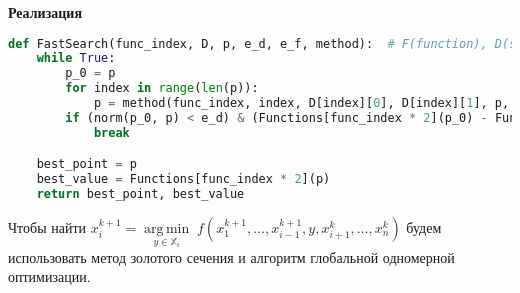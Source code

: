\textbf{Реализация}
\begin{lstlisting}[language=Python]
def FastSearch(func_index, D, p, e_d, e_f, method):  # F(function), D(set), p(start point), e(error)
    while True:
        p_0 = p
        for index in range(len(p)):
            p = method(func_index, index, D[index][0], D[index][1], p, e_d, e_f)
        if (norm(p_0, p) < e_d) & (Functions[func_index * 2](p_0) - Functions[func_index * 2](p) < e_f):
            break

    best_point = p
    best_value = Functions[func_index * 2](p)
    return best_point, best_value
\end{lstlisting}


\begin{remark*}
Чтобы найти ${\displaystyle x_{i}^{k+1}={\underset {y\in \mathbb {X}_i }{\operatorname {arg\,min} }}\;f(x_{1}^{k+1},\dots ,x_{i-1}^{k+1},y,x_{i+1}^{k},\dots ,x_{n}^{k})}$ будем использовать метод золотого сечения и алгоритм глобальной одномерной оптимизации.   
\end{remark*}

